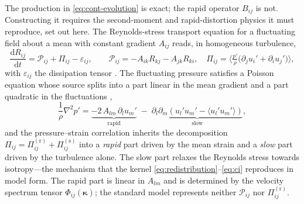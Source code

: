 \documentclass[lineno]{JFM-FLM_Au}
\begin{document}
The production in \eqref{eq:cont-evolution} is exact; the rapid operator
$B_{ij}$ is not. Constructing it requires the second-moment and
rapid-distortion physics it must reproduce, set out here. The
Reynolds-stress transport equation for a fluctuating field about a
mean with constant gradient $A_{ij}$ reads, in homogeneous turbulence,
\begin{equation}
  \frac{\mathrm{d}R_{ij}}{\mathrm{d}t}
  = \mathcal{P}_{ij} + \Pi_{ij} - \varepsilon_{ij},
  \qquad
  \mathcal{P}_{ij}=-A_{ik}R_{kj}-A_{jk}R_{ki},
  \quad
  \Pi_{ij}=\Big\langle \tfrac{p'}{\rho}
            \big(\partial_j u_i'+\partial_i u_j'\big)\Big\rangle,
  \label{eq:rstransport}
\end{equation}
with $\varepsilon_{ij}$ the dissipation tensor \citep{Pope2000}. The
fluctuating pressure satisfies a Poisson equation whose source splits
into a part linear in the mean gradient and a part quadratic in the
fluctuations \citep{Pope2000},
\begin{equation}
  \frac{1}{\rho}\nabla^2 p'
  = \underbrace{-2\,A_{lm}\,\partial_l u_m'}_{\text{rapid}}
    \;-\;
    \underbrace{\partial_l\partial_m\!\left(u_l' u_m'
     -\langle u_l' u_m'\rangle\right)}_{\text{slow}} ,
  \label{eq:poisson}
\end{equation}
and the pressure--strain correlation inherits the decomposition
$\Pi_{ij}=\Pi^{(\mathrm r)}_{ij}+\Pi^{(\mathrm s)}_{ij}$ into a
\emph{rapid} part driven by the mean strain and a \emph{slow} part driven
by the turbulence alone. The slow part relaxes the Reynolds stress
towards isotropy---the mechanism that the kernel
\eqref{eq:redistribution}--\eqref{eq:ci} reproduces in model form. The
rapid part is linear in $A_{lm}$ and is determined by the velocity
spectrum tensor $\Phi_{ij}(\boldsymbol{\kappa})$; the standard model
represents neither $\mathcal{P}_{ij}$ nor $\Pi^{(\mathrm r)}_{ij}$.
\end{document}
